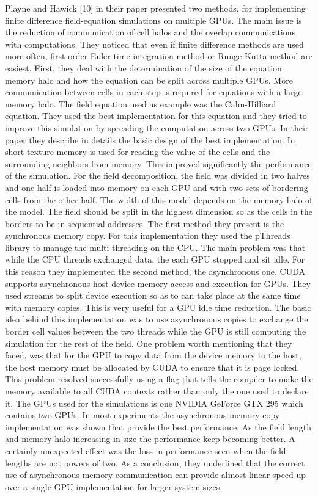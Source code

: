 Playne and Hawick [10] in their paper presented two methods, for implementing finite difference field-equation simulations on multiple GPUs. The main issue is the reduction of communication of cell halos and the overlap communications with computations. They noticed that even if finite difference methods are used more often, first-order Euler time integration method or Runge-Kutta method are easiest. First, they deal with the determination of the size of the equation memory halo and how the equation can be split across multiple GPUs. More communication between cells in each step is required for equations with a large memory halo. The field equation used as example was the Cahn-Hilliard equation. They used the best implementation for this equation and they tried to improve this simulation by spreading the computation across two GPUs. In their paper they describe in details the basic design of the best implementation. In short texture memory is used for reading the value of the cells and the surrounding neighbors from memory. This improved significantly the performance of the simulation. For the field decomposition, the field was divided in two halves and one half is loaded into memory on each GPU and with two sets of bordering cells from the other half. The width of this model depends on the memory halo of the model. The field should be split in the highest dimension so as the cells in the borders to be in sequential addresses. The first method they present is the synchronous memory copy. For this implementation they used the pThreads library to manage the multi-threading on the CPU. The main problem was that while the CPU threads exchanged data, the each GPU stopped and sit idle. For this reason they implemented the second method, the asynchronous one. CUDA supports asynchronous host-device memory access and execution for GPUs. They used streams to split device execution so as to can take place at the same time with memory copies. This is very useful for a GPU idle time reduction. The basic idea behind this implementation was to use asynchronous copies to exchange the border cell values between the two threads while the GPU is still computing the simulation for the rest of the field. One problem worth mentioning that they faced, was that for the GPU to copy data from the device memory to the host, the host memory must be allocated by CUDA to ensure that it is page locked. This problem resolved successfully using a flag that tells the compiler to make the memory available to all CUDA contexts rather than only the one used to declare it. The GPUs used for the simulations is one NVIDIA GeForce GTX 295 which contains two GPUs. In most experiments the asynchronous memory copy implementation was shown that provide the best performance. As the field length and memory halo increasing in size the performance keep becoming better. A certainly unexpected effect was the loss in performance seen when the field lengths are not powers of two. As a conclusion, they underlined that the correct use of asynchronous memory communication can provide almost linear speed up over a single-GPU implementation for larger system sizes.


